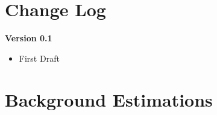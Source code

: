 \documentclass[NOTE, atlasdraft=true, texlive=2016, UKenglish]{\ATLASLATEXPATH atlasdoc}
\begin{document}
\maketitle

\tableofcontents



\newpage
\section{Change Log}
\label{sec:change}
\textbf{Version 0.1}
\begin{itemize}
\item First Draft
\end{itemize}










\newpage
\section{Background Estimations}
\label{sec:bkg}
\end{document}
